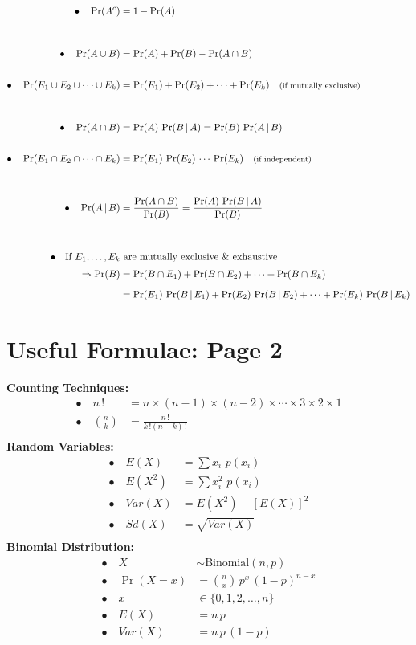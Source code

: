 \documentclass[12pt]{article}
\begin{document}
\begin{align*}
\bullet\quad \Pr(A^c) &= 1 - \Pr(A) \\[1cm]
\bullet\quad \Pr(A \cup B) &= \Pr(A) + \Pr(B) - \Pr(A \cap B)\\[0.6cm]
\bullet\quad \Pr(E_1 \cup E_2 \cup \cdots \cup E_k) &= \Pr(E_1) + \Pr(E_2) + \cdots + \Pr(E_k) \text{\quad{\footnotesize(if mutually exclusive)}}\\[1cm]
\bullet\quad \Pr(A \cap B) &= \Pr(A) \, \Pr(B \, | \, A) = \Pr(B) \, \Pr(A \, | \, B) \\[0.6cm]
\bullet\quad \Pr(E_1 \cap E_2 \cap \cdots \cap E_k) &= \Pr(E_1) \, \Pr(E_2) \, \cdots \, \Pr(E_k) \text{\quad{\footnotesize(if independent)}}\\[1cm]
\bullet\quad \Pr(A\,|\,B) &= \frac{\Pr(A \cap B)}{\Pr(B)} = \frac{\Pr(A) \,\Pr(B\,|\,A)}{\Pr(B)}\\[1cm]
\bullet\quad \text{If $E_1,\ldots, E_k$} & \,\, \text{are mutually exclusive \& exhaustive}\\[0.1cm]
\Rightarrow \Pr(B) &= \Pr(B \cap E_1) + \Pr(B \cap E_2) + \cdots + \Pr(B \cap E_k) \\[0.2cm]
&= \Pr(E_1) \, \Pr(B\,|\,E_1) + \Pr(E_2) \, \Pr(B\,|\,E_2) + \cdots + \Pr(E_k) \, \Pr(B\,|\,E_k)\\
\end{align*}

\newpage

\section*{Useful Formulae: Page 2\\[0.3cm]}
{\bf Counting Techniques:}\\[-0.8cm]
\begin{align*}
\bullet\quad n\,! &= n\times(n-1)\times(n-2)\times\cdots\times3\times2\times 1\\[0.6cm]
\bullet\quad \binom{n}{k} &= \frac{n\,!}{k\,! (n-k)\,!}\\
\end{align*}
{\bf Random Variables:}\\[-0.8cm]
\begin{align*}
\bullet\quad E(X) &= \sum x_i \,\, p(x_i)\\[0.6cm]
\bullet\quad E(X^2) &= \sum x_i^2 \,\, p(x_i)\\[0.6cm]
\bullet\quad Var(X) &= E(X^2) - [E(X)]^2\\[0.6cm]
\bullet\quad Sd(X) &= \sqrt{Var(X)}\\
\end{align*}
{\bf Binomial Distribution:}\\[-0.8cm]
\begin{align*}
\bullet\quad X &\sim \text{Binomial}(n,p)\\[0.6cm]
\bullet\quad \Pr(X=x) &= \binom{n}{x}\,p^x\,(1-p)^{n-x}\\[0.6cm]
\bullet\quad x &\in \{0,1,2,\ldots,n\}\\[0.6cm]
\bullet\quad E(X) &= n\,p \\[0.6cm]
\bullet\quad Var(X) &= n\,p\,(1-p)\\
\end{align*}
\end{document}
